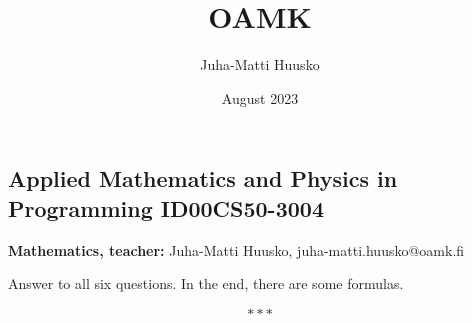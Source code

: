 \documentclass[12pt]{article}
\title{OAMK}
\author{Juha-Matti Huusko}
\date{August 2023}
\begin{document}

\subsection*{Applied Mathematics and Physics in Programming ID00CS50-3004}
\textbf{Mathematics, teacher:} Juha-Matti Huusko, juha-matti.huusko@oamk.fi

\noindent Answer to all six questions. In the end, there are some formulas.

$$
***
$$
\end{document}
